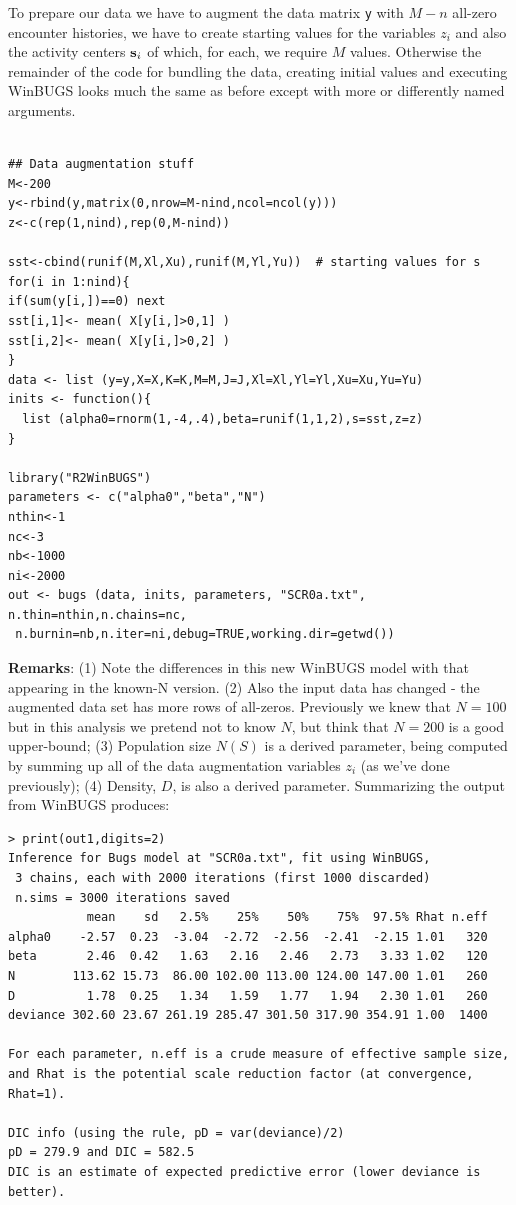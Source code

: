 To prepare our data we have to augment the data matrix \mbox{\tt y} with $M-n$ all-zero encounter histories, we have to create starting values for the variables $z_{i}$ and also the activity centers ${\bf s}_{i}$ of which, for each, we require $M$ values. Otherwise the remainder of the code for bundling the data, creating initial values and executing WinBUGS looks much the same as before except with more or differently named arguments.

\begin{verbatim}

## Data augmentation stuff
M<-200
y<-rbind(y,matrix(0,nrow=M-nind,ncol=ncol(y)))
z<-c(rep(1,nind),rep(0,M-nind))

sst<-cbind(runif(M,Xl,Xu),runif(M,Yl,Yu))  # starting values for s
for(i in 1:nind){
if(sum(y[i,])==0) next
sst[i,1]<- mean( X[y[i,]>0,1] )
sst[i,2]<- mean( X[y[i,]>0,2] )
}
data <- list (y=y,X=X,K=K,M=M,J=J,Xl=Xl,Yl=Yl,Xu=Xu,Yu=Yu)
inits <- function(){
  list (alpha0=rnorm(1,-4,.4),beta=runif(1,1,2),s=sst,z=z)
}

library("R2WinBUGS")
parameters <- c("alpha0","beta","N")
nthin<-1
nc<-3
nb<-1000
ni<-2000
out <- bugs (data, inits, parameters, "SCR0a.txt", n.thin=nthin,n.chains=nc,
 n.burnin=nb,n.iter=ni,debug=TRUE,working.dir=getwd())
\end{verbatim}

{\bf Remarks}:  (1) Note the differences in this new WinBUGS model
with that appearing in the known-N version.  (2) Also the input data
has changed - the augmented data set has more rows of
all-zeros. Previously we knew that $N=100$ but in this analysis we
pretend not to know $N$, but think that $N=200$ is a good upper-bound;
(3) Population size $N(S)$ is a derived parameter, being computed by
summing up all of the data augmentation variables $z_{i}$ (as we've
done previously); (4) Density, $D$, is also a derived
parameter. Summarizing the output from WinBUGS produces: 
\begin{verbatim}
> print(out1,digits=2)
Inference for Bugs model at "SCR0a.txt", fit using WinBUGS,
 3 chains, each with 2000 iterations (first 1000 discarded)
 n.sims = 3000 iterations saved
           mean    sd   2.5%    25%    50%    75%  97.5% Rhat n.eff
alpha0    -2.57  0.23  -3.04  -2.72  -2.56  -2.41  -2.15 1.01   320
beta       2.46  0.42   1.63   2.16   2.46   2.73   3.33 1.02   120
N        113.62 15.73  86.00 102.00 113.00 124.00 147.00 1.01   260
D          1.78  0.25   1.34   1.59   1.77   1.94   2.30 1.01   260
deviance 302.60 23.67 261.19 285.47 301.50 317.90 354.91 1.00  1400

For each parameter, n.eff is a crude measure of effective sample size,
and Rhat is the potential scale reduction factor (at convergence, Rhat=1).

DIC info (using the rule, pD = var(deviance)/2)
pD = 279.9 and DIC = 582.5
DIC is an estimate of expected predictive error (lower deviance is better).
\end{verbatim}

